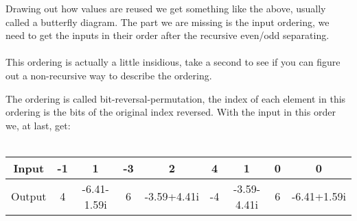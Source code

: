 \documentclass{beamer}
\begin{document}
\begin{frame}
  Drawing out how values are reused we get something like the above, usually called a butterfly diagram. The part we are missing is the input ordering, we need to get the inputs in their order after the recursive even/odd separating.\\~\\
  This ordering is actually a little insidious, take a second to see if you can figure out a non-recursive way to describe the ordering.
\end{frame}

\begin{frame}
  The ordering is called bit-reversal-permutation, the index of each element in this ordering is the bits of the original index reversed. With the input in this order we, at last, get:\\~\\
  \begin{adjustbox}{width = \textwidth}
    \begin{tabular}{ |c|c|c|c|c|c|c|c|c| }
      \hline
      Input  & -1 & 1           & -3 & 2           & 4  & 1           & 0 & 0           \\
      \hline
      Output & 4  & -6.41-1.59i & 6  & -3.59+4.41i & -4 & -3.59-4.41i & 6 & -6.41+1.59i \\
      \hline
    \end{tabular}
  \end{adjustbox}
\end{frame}
\end{document}
